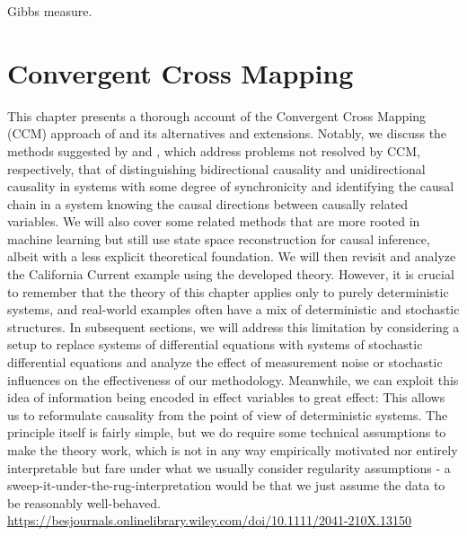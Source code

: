 \documentclass[11pt, a4paper]{memoir}
\theoremstyle{break}
\theoremstyle{break}
\theoremstyle{nonumberplain}
\begin{document}
Gibbs measure.


\chapter{Convergent Cross Mapping}\label{chapTaken}
This chapter presents a thorough account of the Convergent Cross Mapping (CCM) approach of \cite{Sugihara} and its alternatives and extensions. Notably, we discuss the methods suggested by \cite{Ye2015} and \cite{Leng2020}, which address problems not resolved by CCM, respectively, that of distinguishing bidirectional causality and unidirectional causality in systems with some degree of synchronicity and identifying the causal chain in a system knowing the causal directions between causally related variables. We will also cover some related methods that are more rooted in machine learning but still use state space reconstruction for causal inference, albeit with a less explicit theoretical foundation. We will then revisit and analyze the California Current example using the developed theory. However, it is crucial to remember that the theory of this chapter applies only to purely deterministic systems, and real-world examples often have a mix of deterministic and stochastic structures. In subsequent sections, we will address this limitation by considering a setup to replace systems of differential equations with systems of stochastic differential equations and analyze the effect of measurement noise or stochastic influences on the effectiveness of our methodology.
Meanwhile, we can exploit this idea of information being encoded in effect variables to great effect: This allows us to reformulate causality from the point of view of deterministic systems. The principle itself is fairly simple, but we do require some technical assumptions to make the theory work, which is not in any way empirically motivated nor entirely interpretable but fare under what we usually consider regularity assumptions - a sweep-it-under-the-rug-interpretation would be that we just assume the data to be reasonably well-behaved. 
\url{https://besjournals.onlinelibrary.wiley.com/doi/10.1111/2041-210X.13150}
\end{document}
